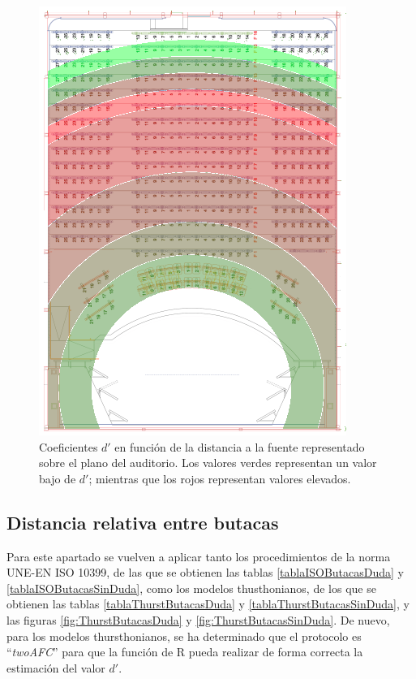 \documentclass[11pt,a4paper,twoside]{book}
\begin{document}
            \begin{figure}
                \includegraphics[scale=0.9]{../imagenes/auditoriodprime.png}
			    \centering
			    \caption{Coeficientes $d'$ en función de la distancia a la fuente representado sobre el plano del auditorio. Los valores verdes representan un valor bajo de $d'$; mientras que los rojos representan valores elevados.} 
			    \label{fig:dprimeauditorio}
            \end{figure}
        
        \subsection{Distancia relativa entre butacas}
            Para este apartado se vuelven a aplicar tanto los procedimientos de la norma UNE-EN ISO 10399, de las que se obtienen las tablas \ref{tablaISOButacasDuda} y \ref{tablaISOButacasSinDuda}, como los modelos thusthonianos, de los que se obtienen las tablas \ref{tablaThurstButacasDuda} y \ref{tablaThurstButacasSinDuda}, y las figuras \ref{fig:ThurstButacasDuda} y \ref{fig:ThurstButacasSinDuda}. De nuevo, para los modelos thursthonianos, se ha determinado que el protocolo es ``\textit{twoAFC}'' para que la función de R pueda realizar de forma correcta la estimación del valor $d'$.\newline
            
\end{document}

